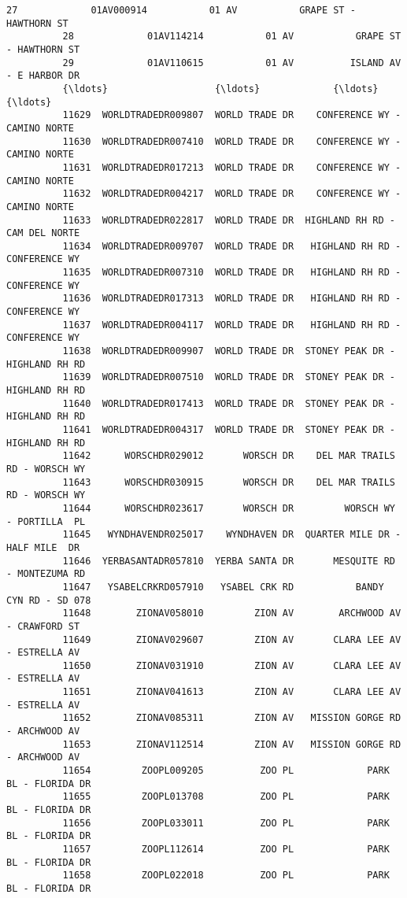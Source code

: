 \documentclass[11pt]{article}
\begin{document}
\begin{Verbatim}[commandchars=\\\{\}]
          27             01AV000914           01 AV           GRAPE ST - HAWTHORN ST   
          28             01AV114214           01 AV           GRAPE ST - HAWTHORN ST   
          29             01AV110615           01 AV          ISLAND AV - E HARBOR DR   
          {\ldots}                   {\ldots}             {\ldots}                              {\ldots}   
          11629  WORLDTRADEDR009807  WORLD TRADE DR    CONFERENCE WY - CAMINO NORTE    
          11630  WORLDTRADEDR007410  WORLD TRADE DR    CONFERENCE WY - CAMINO NORTE    
          11631  WORLDTRADEDR017213  WORLD TRADE DR    CONFERENCE WY - CAMINO NORTE    
          11632  WORLDTRADEDR004217  WORLD TRADE DR    CONFERENCE WY - CAMINO NORTE    
          11633  WORLDTRADEDR022817  WORLD TRADE DR  HIGHLAND RH RD - CAM DEL NORTE    
          11634  WORLDTRADEDR009707  WORLD TRADE DR   HIGHLAND RH RD - CONFERENCE WY   
          11635  WORLDTRADEDR007310  WORLD TRADE DR   HIGHLAND RH RD - CONFERENCE WY   
          11636  WORLDTRADEDR017313  WORLD TRADE DR   HIGHLAND RH RD - CONFERENCE WY   
          11637  WORLDTRADEDR004117  WORLD TRADE DR   HIGHLAND RH RD - CONFERENCE WY   
          11638  WORLDTRADEDR009907  WORLD TRADE DR  STONEY PEAK DR - HIGHLAND RH RD   
          11639  WORLDTRADEDR007510  WORLD TRADE DR  STONEY PEAK DR - HIGHLAND RH RD   
          11640  WORLDTRADEDR017413  WORLD TRADE DR  STONEY PEAK DR - HIGHLAND RH RD   
          11641  WORLDTRADEDR004317  WORLD TRADE DR  STONEY PEAK DR - HIGHLAND RH RD   
          11642      WORSCHDR029012       WORSCH DR    DEL MAR TRAILS RD - WORSCH WY   
          11643      WORSCHDR030915       WORSCH DR    DEL MAR TRAILS RD - WORSCH WY   
          11644      WORSCHDR023617       WORSCH DR         WORSCH WY - PORTILLA  PL   
          11645   WYNDHAVENDR025017    WYNDHAVEN DR  QUARTER MILE DR - HALF MILE  DR   
          11646  YERBASANTADR057810  YERBA SANTA DR       MESQUITE RD - MONTEZUMA RD   
          11647   YSABELCRKRD057910   YSABEL CRK RD           BANDY CYN RD - SD 078    
          11648        ZIONAV058010         ZION AV        ARCHWOOD AV - CRAWFORD ST   
          11649        ZIONAV029607         ZION AV       CLARA LEE AV - ESTRELLA AV   
          11650        ZIONAV031910         ZION AV       CLARA LEE AV - ESTRELLA AV   
          11651        ZIONAV041613         ZION AV       CLARA LEE AV - ESTRELLA AV   
          11652        ZIONAV085311         ZION AV   MISSION GORGE RD - ARCHWOOD AV   
          11653        ZIONAV112514         ZION AV   MISSION GORGE RD - ARCHWOOD AV   
          11654         ZOOPL009205          ZOO PL             PARK BL - FLORIDA DR   
          11655         ZOOPL013708          ZOO PL             PARK BL - FLORIDA DR   
          11656         ZOOPL033011          ZOO PL             PARK BL - FLORIDA DR   
          11657         ZOOPL112614          ZOO PL             PARK BL - FLORIDA DR   
          11658         ZOOPL022018          ZOO PL             PARK BL - FLORIDA DR   
          

\end{Verbatim}
\end{document}
